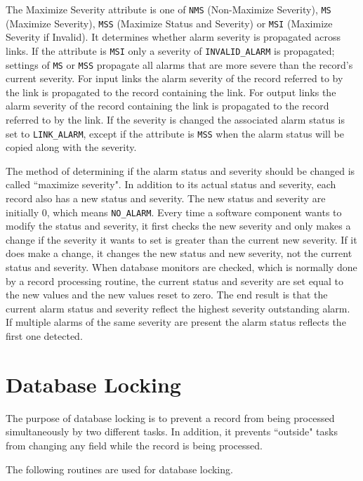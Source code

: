 The Maximize Severity attribute is one of \verb|NMS| (Non-Maximize Severity), \verb|MS| (Maximize Severity),
\verb|MSS| (Maximize Status and Severity) or \verb|MSI| (Maximize Severity if Invalid).
It determines whether alarm severity is propagated across links.
If the attribute is \verb|MSI| only a severity of \verb|INVALID_ALARM| is propagated; settings of \verb|MS| or \verb|MSS|
propagate all alarms that are more severe than the record's current severity.
For input links the alarm severity of the record referred to by the link is propagated to the record containing the link.
For output links the alarm severity of the record containing the link is propagated to the record referred to by the link.
If the severity is changed the associated alarm status is set to \verb|LINK_ALARM|, except if the attribute is \verb|MSS|
when the alarm status will be copied along with the severity.

The method of determining if the alarm status and severity should be changed is called ``maximize severity".
In addition to its actual status and severity, each record also has a new status and severity.
The new status and severity are initially 0, which means \verb|NO_ALARM|.
Every time a software component wants to modify the status and severity, it first checks the new severity and only makes a
change if the severity it wants to set is greater than the current new severity.
If it does make a change, it changes the new status and new severity, not the current status and severity.
When database monitors are checked, which is normally done by a record processing routine, the current status and severity
are set equal to the new values and the new values reset to zero.
The end result is that the current alarm status and severity reflect the highest severity outstanding alarm.
If multiple alarms of the same severity are present the alarm status reflects the first one detected.

\section{Database Locking}

The purpose of database locking is to prevent a record from being processed simultaneously by two different tasks.
In addition, it prevents ``outside" tasks from changing any field while the record is being processed.

The following routines are used for database locking.

